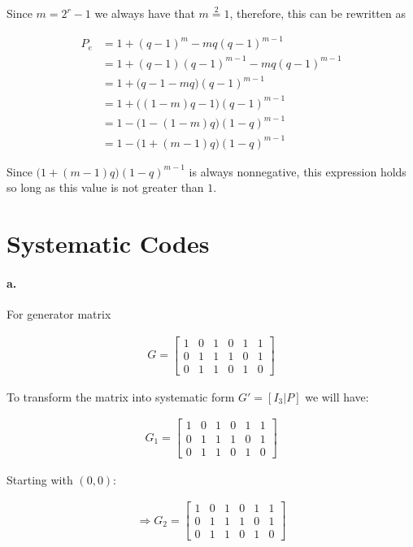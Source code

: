 \documentclass{article}
\begin{document}
Since $m=2^r-1$ we always have that $m\stackrel{2}{=}1$, therefore, this can be
rewritten as

\begin{align*}
  P_e&=1+(q-1)^m-mq(q-1)^{m-1} \\
     &=1+(q-1)(q-1)^{m-1}-mq(q-1)^{m-1}\\
     &=1+\Big(q-1-mq\Big)(q-1)^{m-1}\\
     &=1+\Big((1-m)q-1\Big)(q-1)^{m-1}\\
     &=1-\Big(1-(1-m)q\Big)(1-q)^{m-1}\\
     &=1-\Big(1+(m-1)q\Big)(1-q)^{m-1}
\end{align*}

Since $\Big(1+(m-1)q\Big)(1-q)^{m-1}$ is always nonnegative, this expression holds
so long as this value is not greater than $1$.

\section{Systematic Codes}

\paragraph{a.} For generator matrix

\begin{align*}
  G=\begin{bmatrix}
    1 & 0 & 1 & 0 & 1 & 1 \\
    0 & 1 & 1 & 1 & 0 & 1 \\
    0 & 1 & 1 & 0 & 1 & 0
  \end{bmatrix}
\end{align*}

To transform the matrix into systematic form $G'=[I_3|P]$ we will have:

\begin{align*}
  G_1=\begin{bmatrix}
    1 & 0 & 1 & 0 & 1 & 1 \\
    0 & 1 & 1 & 1 & 0 & 1 \\
    0 & 1 & 1 & 0 & 1 & 0
  \end{bmatrix}
\end{align*}

Starting with $(0,0)$:

\begin{align*}
  \Rightarrow G_2=\begin{bmatrix}
    1 & 0 & 1 & 0 & 1 & 1\\
    0 & 1 & 1 & 1 & 0 & 1\\
    0 & 1 & 1 & 0 & 1 & 0
  \end{bmatrix}
\end{align*}
\end{document}

